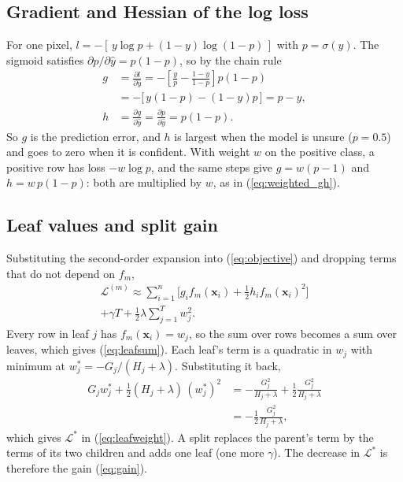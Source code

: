 \subsection{Gradient and Hessian of the log loss}
\label{app:grad}

For one pixel, $l = -[\,y \log p + (1-y)\log(1-p)\,]$ with $p = \sigma(\hat{y})$. The sigmoid satisfies
$\partial p/\partial \hat{y} = p(1-p)$, so by the chain rule
\begin{align}
g &= \frac{\partial l}{\partial \hat{y}}
  = -\left[\frac{y}{p} - \frac{1-y}{1-p}\right] p(1-p) \nonumber\\
  &= -\big[\,y(1-p) - (1-y)p\,\big] = p - y , \\
h &= \frac{\partial g}{\partial \hat{y}} = \frac{\partial p}{\partial \hat{y}} = p(1-p) .
\end{align}
So $g$ is the prediction error, and $h$ is largest when the model is unsure ($p = 0.5$) and goes to zero
when it is confident. With weight $w$ on the positive class, a positive row has loss $-w \log p$, and the
same steps give $g = w(p-1)$ and $h = w\,p(1-p)$: both are multiplied by $w$, as in
(\ref{eq:weighted_gh}).

\subsection{Leaf values and split gain}
\label{app:gain}

Substituting the second-order expansion into (\ref{eq:objective}) and dropping terms that do not depend
on $f_m$,
\begin{multline}
\mathcal{L}^{(m)} \approx \sum_{i=1}^{n} \Big[ g_i f_m(\mathbf{x}_i) + \tfrac{1}{2} h_i f_m(\mathbf{x}_i)^2 \Big] \\
+ \gamma T + \tfrac{1}{2}\lambda \sum_{j=1}^{T} w_j^2 .
\end{multline}
Every row in leaf $j$ has $f_m(\mathbf{x}_i) = w_j$, so the sum over rows becomes a sum over leaves,
which gives (\ref{eq:leafsum}). Each leaf's term is a quadratic in $w_j$ with minimum at
$w_j^\ast = -G_j/(H_j+\lambda)$. Substituting it back,
\begin{align}
G_j w_j^\ast + \tfrac{1}{2}(H_j+\lambda)\, (w_j^\ast)^2
&= -\frac{G_j^2}{H_j+\lambda} + \frac{1}{2}\frac{G_j^2}{H_j+\lambda} \nonumber\\
&= -\frac{1}{2}\frac{G_j^2}{H_j+\lambda} ,
\end{align}
which gives $\mathcal{L}^\ast$ in (\ref{eq:leafweight}). A split replaces the parent's term by the terms
of its two children and adds one leaf (one more $\gamma$). The decrease in $\mathcal{L}^\ast$ is therefore
the gain (\ref{eq:gain}).

